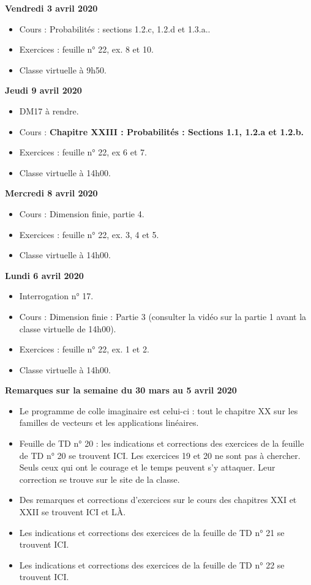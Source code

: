 \documentclass[12pt,a4paper]{article}
\begin{document}
\noindent\textbf{\bf Vendredi 3 avril 2020}
\begin{itemize}
\item Cours : Probabilités : sections 1.2.c, 1.2.d et 1.3.a..
\item Exercices : feuille n° 22, ex. 8 et 10.
\item Classe virtuelle à 9h50.\vspace{.4cm}
\end{itemize}

\noindent\textbf{Jeudi 9 avril 2020}
\begin{itemize}
\item DM17 à rendre.
\item Cours : \bf Chapitre XXIII \rm : Probabilités : Sections 1.1, 1.2.a et 1.2.b.
\item Exercices : feuille n° 22, ex 6 et 7.
\item Classe virtuelle à 14h00.\vspace{.4cm}
\end{itemize}

\noindent\textbf{Mercredi 8 avril 2020}
\begin{itemize}
\item Cours : Dimension finie, partie 4.
\item Exercices : feuille n° 22, ex. 3, 4 et 5.
\item Classe virtuelle à 14h00.\vspace{.4cm}
\end{itemize}

\noindent\textbf{\bf Lundi 6 avril 2020}
\begin{itemize}
\item Interrogation n° 17.
\item Cours : Dimension finie : Partie 3 (consulter la vidéo sur la partie 1 avant la classe virtuelle de 14h00).
\item Exercices : feuille n° 22, ex. 1 et 2.
\item Classe virtuelle à 14h00.\vspace{.4cm}
\end{itemize}


\noindent\textbf{\bf Remarques sur la semaine du 30 mars au 5 avril 2020}
\begin{itemize}
\item Le programme de colle imaginaire est celui-ci : tout le chapitre XX sur les familles de vecteurs et les applications linéaires.
\item Feuille de TD n° 20 : les indications et corrections des exercices de la feuille de TD n° 20 se trouvent ICI. Les exercices 19 et 20 ne sont pas à chercher. Seuls ceux qui ont le courage et le temps peuvent s'y attaquer. Leur correction se trouve sur le site de la classe.
\item Des remarques et corrections d'exercices sur le cours des chapitres XXI et XXII se trouvent ICI et LÀ.
\item Les indications et corrections des exercices de la feuille de TD n° 21 se trouvent ICI.
\item Les indications et corrections des exercices de la feuille de TD n° 22 se trouvent ICI.\vspace{.4cm}
\end{itemize}
\end{document}
